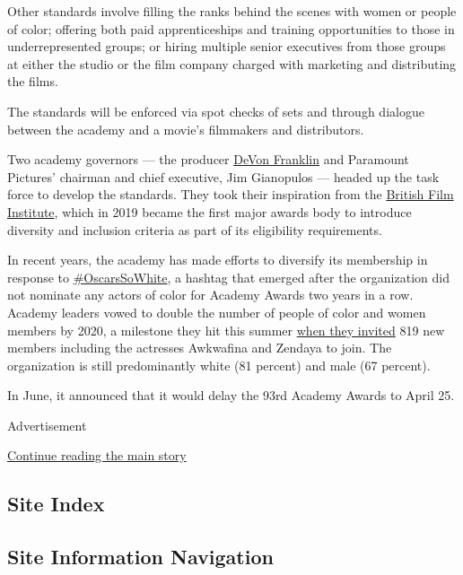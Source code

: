Other standards involve filling the ranks behind the scenes with women
or people of color; offering both paid apprenticeships and training
opportunities to those in underrepresented groups; or hiring multiple
senior executives from those groups at either the studio or the film
company charged with marketing and distributing the films.

The standards will be enforced via spot checks of sets and through
dialogue between the academy and a movie's filmmakers and distributors.

Two academy governors --- the producer
\href{https://devonfranklin.com/}{DeVon Franklin} and Paramount
Pictures' chairman and chief executive, Jim Gianopulos --- headed up the
task force to develop the standards. They took their inspiration from
the
\href{https://www.bfi.org.uk/inclusion-film-industry/bfi-diversity-standards}{British
Film Institute}, which in 2019 became the first major awards body to
introduce diversity and inclusion criteria as part of its eligibility
requirements.

In recent years, the academy has made efforts to diversify its
membership in response to
\href{https://www.nytimes3xbfgragh.onion/2020/02/06/movies/oscarssowhite-history.html}{\#OscarsSoWhite},
a hashtag that emerged after the organization did not nominate any
actors of color for Academy Awards two years in a row. Academy leaders
vowed to double the number of people of color and women members by 2020,
a milestone they hit this summer
\href{https://www.nytimes3xbfgragh.onion/2020/06/30/movies/academy-oscars-new-members.html}{when
they invited} 819 new members including the actresses Awkwafina and
Zendaya to join. The organization is still predominantly white (81
percent) and male (67 percent).

In June, it announced that it would delay the 93rd Academy Awards to
April 25.

Advertisement

\protect\hyperlink{after-bottom}{Continue reading the main story}

\hypertarget{site-index}{%
\subsection{Site Index}\label{site-index}}

\hypertarget{site-information-navigation}{%
\subsection{Site Information
Navigation}\label{site-information-navigation}}

